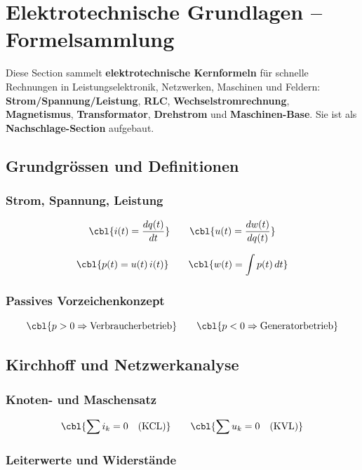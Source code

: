 \section{Elektrotechnische Grundlagen -- Formelsammlung}

Diese Section sammelt \textbf{elektrotechnische Kernformeln} für schnelle Rechnungen
in Leistungselektronik, Netzwerken, Maschinen und Feldern:
\textbf{Strom/Spannung/Leistung}, \textbf{RLC}, \textbf{Wechselstromrechnung},
\textbf{Magnetismus}, \textbf{Transformator}, \textbf{Drehstrom} und \textbf{Maschinen-Base}.
Sie ist als \textbf{Nachschlage-Section} aufgebaut.

\subsection{Grundgrössen und Definitionen}

\subsubsection{Strom, Spannung, Leistung}

\[
\cbl{i(t) = \frac{dq(t)}{dt}}
\qquad
\cbl{u(t) = \frac{dw(t)}{dq(t)}}
\]

\[
\cbl{p(t) = u(t)\, i(t)}
\qquad
\cbl{w(t) = \int p(t)\,dt}
\]

\subsubsection{Passives Vorzeichenkonzept}

\[
\cbl{p>0 \Rightarrow \text{Verbraucherbetrieb}}
\qquad
\cbl{p<0 \Rightarrow \text{Generatorbetrieb}}
\]

\subsection{Kirchhoff und Netzwerkanalyse}

\subsubsection{Knoten- und Maschensatz}

\[
\cbl{\sum i_k = 0 \quad \text{(KCL)}}
\qquad
\cbl{\sum u_k = 0 \quad \text{(KVL)}}
\]

\subsubsection{Leiterwerte und Widerstände}

